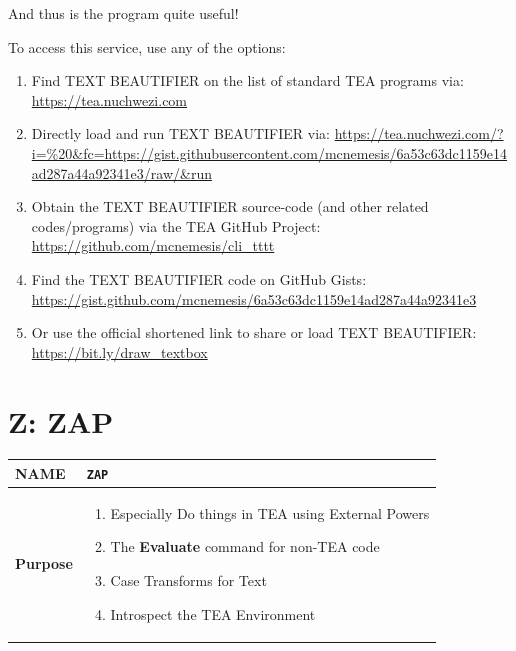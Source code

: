 \documentclass[a4paper, 18pt]{book} %
\begin{document}
{{{ 
 And thus is the program quite useful! 
 
 \vspace{2em}

To access this service, use any of the options:

\vspace{2em}

\begin{enumerate}
\item Find TEXT BEAUTIFIER on the list of standard TEA programs via:\\ \url{https://tea.nuchwezi.com}
\item Directly load and run TEXT BEAUTIFIER via: {\normalsize \url{https://tea.nuchwezi.com/?i=\%20&fc=https://gist.githubusercontent.com/mcnemesis/6a53c63dc1159e14ad287a44a92341e3/raw/&run} }
\item{Obtain the TEXT BEAUTIFIER source-code (and other related codes/programs) via the TEA GitHub Project:\\
\url{https://github.com/mcnemesis/cli_tttt}}
\item{ Find the TEXT BEAUTIFIER code on GitHub Gists:\\
\url{https://gist.github.com/mcnemesis/6a53c63dc1159e14ad287a44a92341e3}}
\item{ Or use the official shortened link to share or load TEXT BEAUTIFIER:\\
 \url{https://bit.ly/draw_textbox}
 }
\end{enumerate}

\vspace{2em}





\chapter{Z: ZAP}
\label{CHAPZ}


\begin{table}[H]
  \centering
  \LARGE
	\begin{tabular}[t]{|p{}|p{}}
 
	\textbf{NAME} & \texttt{ZAP}\\
	\hline
	\textbf{Purpose} & \begin{enumerate}
	\item Especially Do things in TEA using External Powers
	\item The \textbf{Evaluate} command for non-TEA code
	\item Case Transforms for Text
	\item Introspect the TEA Environment
	\end{enumerate}\\
	\hline
	              

\end{tabular}
\end{table}}}}
\end{document}
